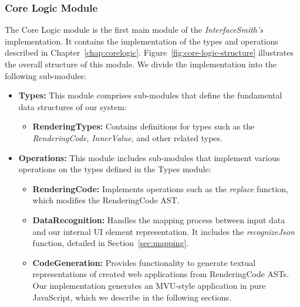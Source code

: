 \subsubsection{Core Logic Module}
The Core Logic module is the first main module of the \emph{InterfaceSmith's} implementation.
It contains the implementation of the types and operations described in Chapter~\ref{chap:corelogic}.
Figure~\ref{fig:core-logic-structure} illustrates the overall structure of this module.
We divide the implementation into the following sub-modules:
\nopagebreak[4]
\begin{itemize}
	\item \textbf{Types:} This module comprises sub-modules that define the fundamental data structures of our system:
	      \begin{itemize}
		      \item \textbf{RenderingTypes:} Contains definitions for types such as the \emph{RenderingCode}, \emph{InnerValue}, and other related types.
	      \end{itemize}

	\item \textbf{Operations:} This module includes sub-modules that implement various operations on the types defined in the Types module:
	      \begin{itemize}
		      \item \textbf{RenderingCode:} Implements operations such as the \emph{replace} function, which modifies the RenderingCode AST.


		      \item \textbf{DataRecognition:}  Handles the mapping process between input data and our internal UI element representation.
		            It includes the \emph{recognizeJson} function, detailed in Section~\ref{sec:mapping}.

		      \item\textbf{CodeGeneration:} Provides functionality to generate textual representations of created web applications from RenderingCode ASTs.
		            Our implementation generates an MVU-style application in pure JavaScript, which we describe in the following sections.
	      \end{itemize}
\end{itemize}

